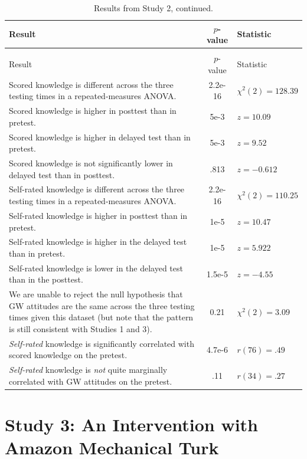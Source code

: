 \begin{longtabu}{X[2.5]S[table-parse-only]X[l]}

\caption{Summary of results from Study 2.\label{table:RPP-mech-results}}\\ 
\toprule
Result & {$p$-value} & Statistic \\ \midrule
\endfirsthead

\caption[]{Results from Study 2, continued.}\\
\toprule
Result & {$p$-value} & Statistic \\ \midrule
\endhead

\bottomrule
\endfoot

Scored knowledge is different across the three testing times in a repeated-measures ANOVA. &
2.2e-16 & $\chi^2(2)=128.39$  \\
Scored knowledge is higher in posttest than in pretest. & 5e-3 & $z=10.09$ \\
Scored knowledge is higher in delayed test than in pretest. & 5e-3 & $z=9.52$ \\
Scored knowledge is not significantly lower in delayed test than in posttest. &
.813 & $z=-0.612$ \\
Self-rated knowledge is different across the three testing times in a repeated-measures ANOVA. &
2.2e-16 & $\chi^2(2)=110.25$ \\
Self-rated knowledge is higher in posttest than in pretest. & 1e-5 & $z=10.47$ \\
Self-rated knowledge is higher in the delayed test than in pretest. & 1e-5 &
$z=5.922$ \\
Self-rated knowledge is lower in the delayed test than in the posttest. &
1.5e-5 & $z=-4.55$ \\
We are unable to reject the null hypothesis that GW attitudes are the same
across the three testing times given this dataset (but note that the pattern is
still consistent with Studies 1 and 3). & 0.21 & $\chi^2(2) = 3.09$ \\
\emph{Self-rated} knowledge is significantly correlated with scored knowledge on the
pretest. & 4.7e-6 & $r(76)=.49$ \\
\emph{Self-rated} knowledge is \emph{not} quite marginally correlated with GW attitudes on
the pretest. & .11 & $r(34)=.27$ \\

\end{longtabu}

\section{Study 3: An Intervention with Amazon Mechanical Turk}
\label{sec:mech-mturk}

